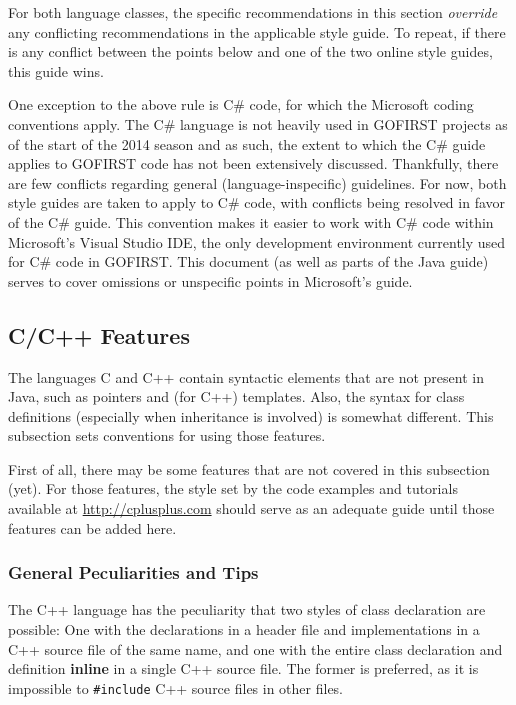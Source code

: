 \documentclass[12pt]{article}
\newcommand{\code}[1]{\texttt{#1}}
\newcommand{\textdef}[1]{\textbf{#1}}
\begin{document}
For both language classes, the specific recommendations in this section \emph{override} any conflicting recommendations in the applicable style guide. To repeat, if there is any conflict between the points below and one of the two online style guides, this guide wins.

One exception to the above rule is C\# code, for which the Microsoft coding conventions \cite{csguide} apply. The C\# language is not heavily used in GOFIRST projects as of the start of the 2014 season and as such, the extent to which the C\# guide applies to GOFIRST code has not been extensively discussed. Thankfully, there are few conflicts regarding general (language-inspecific) guidelines. For now, both style guides are taken to apply to C\# code, with conflicts being resolved in favor of the C\# guide. This convention makes it easier to work with C\# code within Microsoft's Visual Studio IDE, the only development environment currently used for C\# code in GOFIRST. This document (as well as parts of the Java guide) serves to cover omissions or unspecific points in Microsoft's guide.

\subsection{C/C++ Features}
\label{sec:ccpp-special}
The languages C and C++ contain syntactic elements that are not present in Java, such as pointers and (for C++) templates. Also, the syntax for class definitions (especially when inheritance is involved) is somewhat different. This subsection sets conventions for using those features.

First of all, there may be some features that are not covered in this subsection (yet). For those features, the style set by the code examples and tutorials available at \url{http://cplusplus.com} should serve as an adequate guide until those features can be added here.


\subsubsection{General Peculiarities and Tips}
The C++ language has the peculiarity that two styles of class declaration are possible: One with the declarations in a header file and implementations in a C++ source file of the same name, and one with the entire class declaration and definition \textdef{inline} in a single C++ source file. The former is preferred, as it is impossible to \code{\#include} C++ source files in other files.
\end{document}
